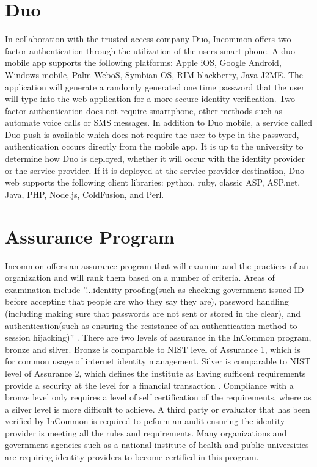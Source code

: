 \documentclass[9pt,twocolumn,twoside]{../../styles/osajnl}
\begin{document}
\section{Duo}

In collaboration with the trusted access company Duo, Incommon offers
two factor authentication through the utilization of the users smart
phone\cite{www-duo}.  A duo mobile app supports the following
platforms: Apple iOS, Google Android, Windows mobile, Palm WeboS,
Symbian OS, RIM blackberry, Java J2ME.  The application will generate
a randomly generated one time password that the user will type into
the web application for a more secure identity verification.  Two
factor authentication does not require smartphone, other methods such
as automate voice calls or SMS messages.  In addition to Duo mobile, a
service called Duo push is available which does not require the user
to type in the password, authentication occurs directly from the
mobile app.  It is up to the university to determine how Duo is
deployed, whether it will occur with the identity provider or the
service provider.  If it is deployed at the service provider
destination, Duo web supports the following client libraries: python,
ruby, classic ASP, ASP.net, Java, PHP, Node.js, ColdFusion, and Perl.

\section{Assurance Program}

Incommon offers an assurance program that will examine and the
practices of an organization and will rank them based on a number of
criteria.  Areas of examination include ''...identity proofing(such as
checking government issued ID before accepting that people are who
they say they are), password handling (including making sure that
passwords are not sent or stored in the clear), and
authentication(such as ensuring the resistance of an authentication
method to session hijacking)'' \cite{www-harvard}.  There are two
levels of assurance in the InCommon program, bronze and silver.
Bronze is comparable to NIST level of Assurance 1, which is for common
usage of internet identity management.  Silver is comparable to NIST
level of Assurance 2, which defines the institute as having sufficent
requirements provide a security at the level for a financial
transaction \cite{www-levels}.  Compliance with a bronze level only
requires a level of self certification of the requirements, where as a
silver level is more difficult to achieve.  A third party or evaluator
that has been verified by InCommon is required to peform an audit
ensuring the identity provider is meeting all the rules and
requirements.  Many organizations and government agencies such as a
national institute of health and public universities are requiring
identity providers to become certified in this program.
\end{document}
